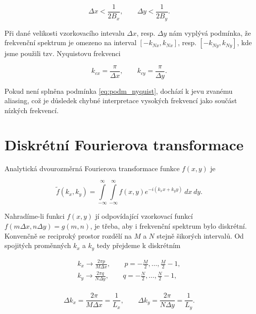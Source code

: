 \begin{equation}\label{eq:podm_nyquist}
\Delta x < \frac{1}{2 B_x}, \qquad \Delta y < \frac{1}{2 B_y}.
\end{equation}

Při dané velikosti vzorkovacího intevalu $\Delta x$, resp. $\Delta y$ nám vyplývá podmínka, že frekvenční spektrum je omezeno na interval $[-k_{Nx}, k_{Nx}]$, resp. $ [-k_{Ny},k_{Ny}]$, kde jsme použili tzv. Nyquistovu frekvenci

\begin{equation}
k_{cx} = \frac{\pi}{ \Delta x}, \qquad k_{cy} = \frac{\pi}{ \Delta y}.
\end{equation}

Pokud není splněna podmínka \eqref{eq:podm_nyquist}, dochází k jevu zvanému aliasing, což je důsledek chybné interpretace vysokých frekvencí jako součást nízkých frekvencí.


\section{Diskrétní Fourierova transformace}
\label{sec:dis_four}

Analytická dvourozměrná Fourierova transformace funkce $f(x,y)$ je

\begin{equation}
\widetilde{f}(k_x,k_y) = \int\limits_{-\infty}^{\infty} \int\limits_{-\infty}^{\infty} f(x,y) e^{-i(k_x x + k_y y)} ~dx ~dy.
\end{equation}

Nahradíme-li funkci $f(x,y)$ jí odpovídající vzorkovací funkcí $f(m \Delta x,n \Delta y)=g(m,n)$, je třeba, aby i frekvenční spektrum bylo diskrétní. Konvenčně se reciproký prostor rozdělí na $M$ a $N$ stejně šikorých intervalů. Od spojitých proměnných $k_x$ a $k_y$ tedy přejdeme k diskrétním

\begin{equation}\label{eq:disk_frekvence}
\begin{aligned}
k_x \rightarrow \frac{2 \pi p}{M \Delta x}, \qquad p = -\frac{M}{2}, \dots, \frac{M}{2}-1, \\[10pt]
k_y \rightarrow \frac{2 \pi q}{N \Delta y}, \qquad q = -\frac{N}{2}, \dots, \frac{N}{2}-1, \\
\end{aligned}
\end{equation}

\begin{equation}
\Delta k_x = \frac{2 \pi}{M \Delta x} = \frac{1}{L_x}, \qquad \Delta k_y = \frac{2 \pi}{N \Delta y} = \frac{1}{L_y}.
\end{equation}

